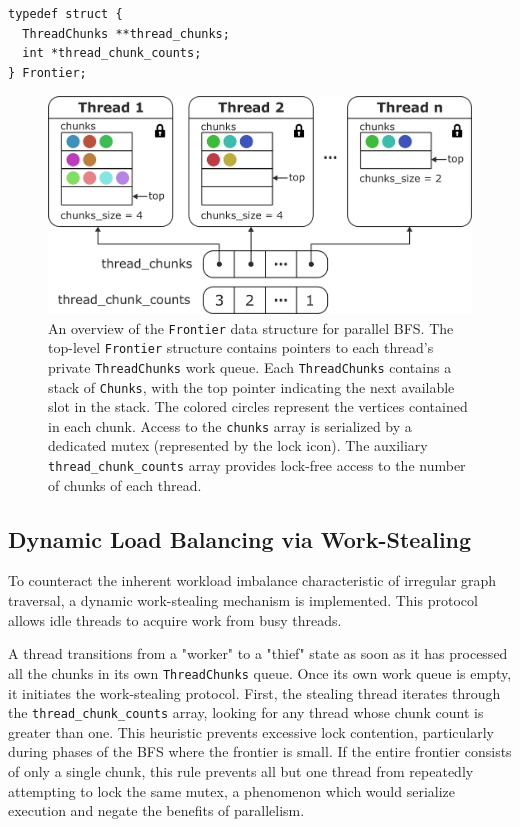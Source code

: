 \begin{verbatim}
typedef struct {
  ThreadChunks **thread_chunks;
  int *thread_chunk_counts;
} Frontier;
\end{verbatim}

\begin{figure}[h]
    \centering
    \includegraphics[width=0.7\linewidth]{images/frontier.png}
    \caption{An overview of the \texttt{Frontier} data structure for parallel BFS. The top-level \texttt{Frontier} structure contains pointers to each thread's private \texttt{ThreadChunks} work queue. Each \texttt{ThreadChunks} contains a stack of \texttt{Chunks}, with the top pointer indicating the next available slot in the stack. The colored circles represent the vertices contained in each chunk. Access to the \texttt{chunks} array is serialized by a dedicated mutex (represented by the lock icon). The auxiliary \texttt{thread\_chunk\_counts} array provides lock-free access to the number of chunks of each thread.}
    \label{fig:frontier}
\end{figure}

\subsection{Dynamic Load Balancing via Work-Stealing}

To counteract the inherent workload imbalance characteristic of irregular graph traversal, a dynamic work-stealing mechanism is implemented. This protocol allows idle threads to acquire work from busy threads.

A thread transitions from a "worker" to a "thief" state as soon as it has processed all the chunks in its own \texttt{ThreadChunks} queue. Once its own work queue is empty, it initiates the work-stealing protocol. First, the stealing thread iterates through the \texttt{thread\_chunk\_counts} array, looking for any thread whose chunk count is greater than one. This heuristic prevents excessive lock contention, particularly during phases of the BFS where the frontier is small. If the entire frontier consists of only a single chunk, this rule prevents all but one thread from repeatedly attempting to lock the same mutex, a phenomenon which would serialize execution and negate the benefits of parallelism.

